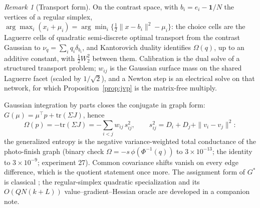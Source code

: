 \documentclass[12pt]{article}
\theoremstyle{remark}
\newtheorem{remark}{Remark}
\begin{document}
\begin{remark}[Transport form]
On the contrast space, with $b_i = e_i - \mathbf{1}/N$ the vertices of
a regular simplex, $\arg\max_i (x_i + \mu_i) = \arg\min_i
\{\tfrac12 \|x - b_i\|^2 - \mu_i\}$: the choice cells are the
Laguerre cells of quadratic semi-discrete optimal transport from the
contrast Gaussian to $\nu_q = \sum_i q_i \delta_{b_i}$, and
Kantorovich duality identifies $\Omega(q)$, up to an additive constant,
with $\tfrac12 W_2^2$ between them. Calibration is the dual solve of a
structured transport problem; $w_{ij}$ is the Gaussian surface mass on
the shared Laguerre facet (scaled by $1/\sqrt2$), and a Newton step is
an electrical solve on that network, for which
Proposition~\ref{prop:jvp} is the matrix-free multiply.

Gaussian integration by parts closes the conjugate in graph form:
$G(\mu) = \mu^\top p + \mathrm{tr}(\Sigma J)$, hence
\[
\Omega(p) = -\mathrm{tr}(\Sigma J)
= -\sum_{i<j} w_{ij}\, s_{ij}^2, \qquad
s_{ij}^2 = D_i + D_j + \|v_i - v_j\|^2 :
\]
the generalized entropy is the negative variance-weighted total
conductance of the photo-finish graph (binary check
$\Omega = -s\,\phi(\Phi^{-1}(q))$ to $3\times10^{-13}$; the identity to
$3\times10^{-9}$; experiment 27). Common covariance shifts vanish on
every edge difference, which is the quotient statement once more. The
assignment form of $G^*$ is classical \citep{chiong2016}; the
regular-simplex quadratic specialization and its $O(QN(k+L))$
value--gradient--Hessian oracle are developed in a companion note.
\end{remark}
\end{document}
